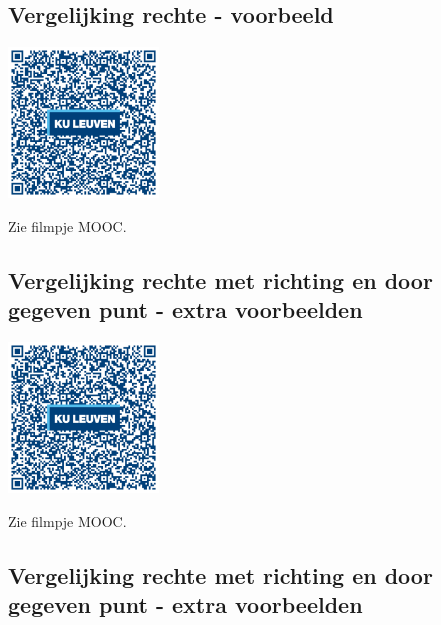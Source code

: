
\subsection{Vergelijking rechte - voorbeeld}
\begin{minipage}{.25\linewidth}
	\raggedright
	\includegraphics[width=4cm]{4_opp_inhoud_an_meetk/inputs/QR_Code_VGLRECHTE_module4new}
\end{minipage}
\begin{minipage}{.7\linewidth}
	Zie filmpje MOOC.
\end{minipage}


\subsection{Vergelijking rechte met richting en door gegeven punt - extra voorbeelden}
\begin{minipage}{.25\linewidth}
	\raggedright
	\includegraphics[width=4cm]{4_opp_inhoud_an_meetk/inputs/QR_Code_VGLRECHTEVB_module4new}
\end{minipage}
\begin{minipage}{.7\linewidth}
	Zie filmpje MOOC.
\end{minipage}

\subsection{Vergelijking rechte met richting en door gegeven punt - extra voorbeelden}

